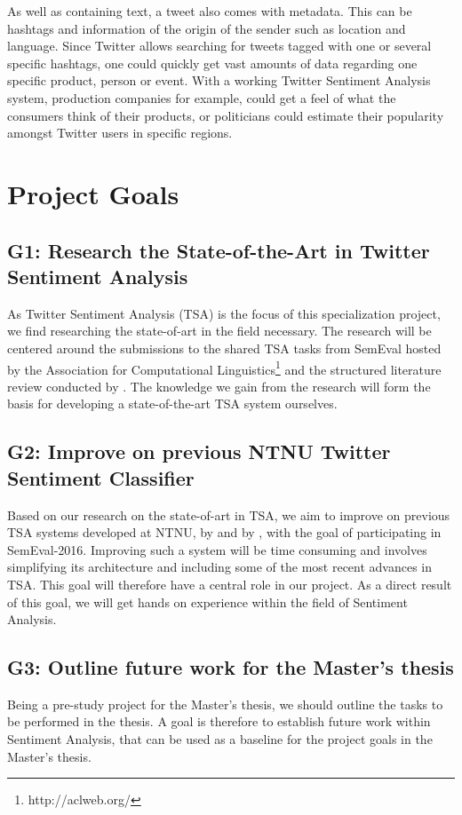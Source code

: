 As well as containing text, a tweet also comes with metadata. This can be hashtags and information of the origin of the sender such as location and language. Since Twitter allows searching for tweets tagged with one or several specific hashtags, one could quickly get vast amounts of data regarding one specific product, person or event. With a working Twitter Sentiment Analysis system, production companies for example, could get a feel of what the consumers think of their products, or politicians could estimate their popularity amongst Twitter users in specific regions.


\section{Project Goals}
\label{sec:project_goals}

\subsection*{G1: Research the State-of-the-Art in Twitter Sentiment Analysis}
As Twitter Sentiment Analysis (TSA) is the focus of this specialization project, we find researching the state-of-art in the field necessary. The research will be centered around the submissions to the shared TSA tasks from SemEval hosted by the Association for Computational Linguistics\footnote{http://aclweb.org/} and the structured literature review conducted by \cite{SelmerBrevik}. The knowledge we gain from the research will form the basis for developing a state-of-the-art TSA system ourselves. 

\subsection*{G2: Improve on previous NTNU Twitter Sentiment Classifier}
Based on our research on the state-of-art in TSA, we aim to improve on previous TSA systems developed at NTNU, by \citet{SelmerBrevik} and by \citet{FaretReitan}, with the goal of participating in SemEval-2016. Improving such a system will be time consuming and involves simplifying its architecture and including some of the most recent advances in TSA. This goal will therefore have a central role in our project. As a direct result of this goal, we will get hands on experience within the field of Sentiment Analysis.

\subsection*{G3: Outline future work for the Master's thesis}
Being a pre-study project for the Master's thesis, we should outline the tasks to be performed in the thesis. A goal is therefore to establish future work within Sentiment Analysis, that can be used as a baseline for the project goals in the Master's thesis.


